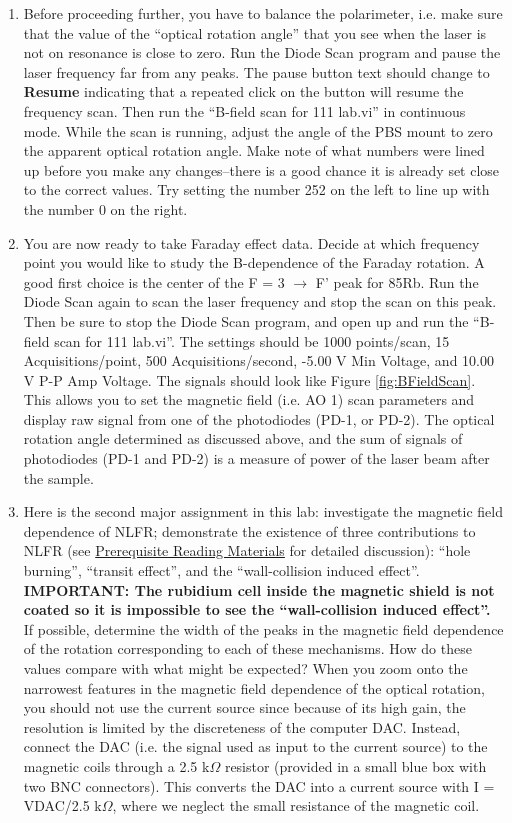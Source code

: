 \documentclass{../lab}
\begin{document}
\begin{enumerate}
    \item Before proceeding further, you have to balance the polarimeter, i.e. make sure that the value of the ``optical rotation angle'' that you see when the laser is not on resonance is close to zero. Run the Diode Scan program and pause the laser frequency far from any peaks. The pause button text should change to \textbf{Resume} indicating that a repeated click on the button will resume the frequency scan. Then run the ``B-field scan for 111 lab.vi'' in continuous mode. While the scan is running, adjust the angle of the PBS mount to zero the apparent optical rotation angle. Make note of what numbers were lined up before you make any changes--there is a good chance it is already set close to the correct values. Try setting the number 252 on the left to line up with the number 0 on the right.
    
\newpage
    
    \item You are now ready to take Faraday effect data. Decide at which frequency point you would like to study the B-dependence of the Faraday rotation. A good first choice is the center of the F = 3 $\rightarrow$ F' peak for 85Rb. Run the Diode Scan again to scan the laser frequency and stop the scan on this peak. Then be sure to stop the Diode Scan program, and open up and run the ``B-field scan for 111 lab.vi''. The settings should be 1000 points/scan, 15 Acquisitions/point, 500 Acquisitions/second, -5.00 V Min Voltage, and 10.00 V P-P Amp Voltage. The signals should look like Figure \ref{fig:BFieldScan}. This allows you to set the magnetic field (i.e. AO 1) scan parameters and display raw signal from one of the photodiodes (PD-1, or PD-2). The optical rotation angle determined as discussed above, and the sum of signals of photodiodes (PD-1 and PD-2) is a measure of power of the laser beam after the sample.
    
    \item Here is the second major assignment in this lab: investigate the magnetic field dependence of NLFR; demonstrate the existence of three contributions to NLFR (see \hyperref[sec:BeforeFirstDay]{Prerequisite Reading Materials} for detailed discussion): ``hole burning'', ``transit effect'', and the ``wall-collision induced effect''. \textbf{IMPORTANT: The rubidium cell inside the magnetic shield is not coated so it is impossible to see the ``wall-collision induced effect''.} If possible, determine the width of the peaks in the magnetic field dependence of the rotation corresponding to each of these mechanisms. How do these values compare with what might be expected? When you zoom onto the narrowest features in the magnetic field dependence of the optical rotation, you should not use the current source since because of its high gain, the resolution is limited by the discreteness of the computer DAC. Instead, connect the DAC (i.e. the signal used as input to the current source) to the magnetic coils through a 2.5 k$\Omega$ resistor (provided in a small blue box with two BNC connectors). This converts the DAC into a current source with I = VDAC/2.5 k$\Omega$, where we neglect the small resistance of the magnetic coil.
    

\end{enumerate}
\end{document}
